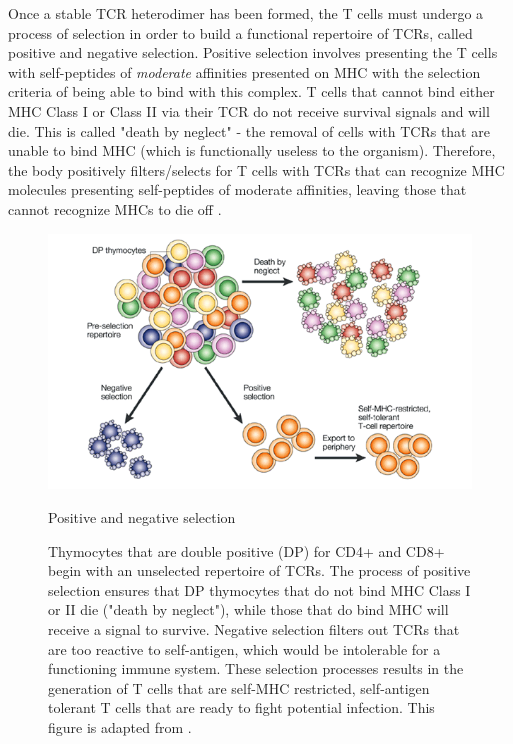 Once a stable TCR heterodimer has been formed, the T cells must undergo a process of selection in order to build a functional repertoire of TCRs, called positive and negative selection. Positive selection involves presenting the T cells with self-peptides of \textit{moderate} affinities presented on MHC with the selection criteria of being able to bind with this complex.  T cells that cannot bind either MHC Class I or Class II via their TCR do not receive survival signals and will die. This is called "death by neglect" - the removal of cells with TCRs that are unable to bind MHC (which is functionally useless to the organism). Therefore, the body positively filters/selects for T cells with TCRs that can recognize MHC molecules presenting self-peptides of moderate affinities, leaving those that cannot recognize MHCs to die off \cite{Palmer2003}.

\begin{figure}[htbp]
	\centering
	\includegraphics[width=\textwidth]{../figures/chapter1/posnegsel.png}
	\caption{Positive and negative selection}
	\caption*{Thymocytes that are double positive (DP) for CD4+ and CD8+ begin with an unselected repertoire of TCRs. The process of positive selection ensures that DP thymocytes that do not bind MHC Class I or II die ("death by neglect"), while those that do bind MHC will receive a signal to survive. Negative selection filters out TCRs that are too reactive to self-antigen, which would be intolerable for a functioning immune system.  These selection processes results in the generation of T cells that are self-MHC restricted, self-antigen tolerant T cells that are ready to fight potential infection. This figure is adapted from \cite{Palmer2003}.}
	\label{fig:posnegsel}
\end{figure}

